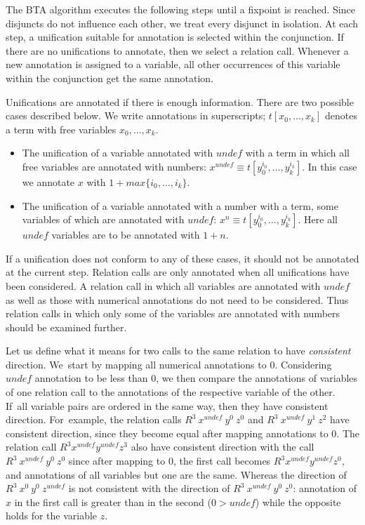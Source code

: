 \documentclass[submission,copyright,creativecommons]{eptcs}
\newcommand\undef{unde\!f}
\begin{document}
The BTA algorithm executes the following steps until a fixpoint is reached.
Since disjuncts do not influence each other, we treat every disjunct in isolation.
At each step, a unification suitable for annotation is selected within the conjunction.
If there are no unifications to annotate, then we select a relation call.
Whenever a new annotation is assigned to a variable, all other occurrences of this variable within the conjunction get the same annotation.

Unifications are annotated if there is enough information.
There are two possible cases described below.
We write annotations in superscripts; $t[x_0, \dots, x_k]$ denotes a term with free variables $x_0, \dots, x_k$.
\begin{itemize}
  \item The unification of a variable annotated with $\undef{}$ with a term in which all free variables are annotated with numbers: $x^{\undef{}} \equiv t[y_0^{i_0},\dots, y_k^{i_k}]$. In this case we annotate $x$ with $1+max\{i_0,\dots,i_k\}$.
  \item The unification of a variable annotated with a number with a term, some variables of which are annotated with $\undef{}$: $x^{n} \equiv t[y_0^{i_0},\dots, y_k^{i_k}]$. Here all $\undef{}$ variables are to be annotated with $1+n$.
\end{itemize}

If a unification does not conform to any of these cases, it should not be annotated at the current step.
Relation calls are only annotated when all unifications have been considered.
A relation call in which all variables are annotated with $\undef{}$ as well as those with numerical annotations do not need to be considered.
Thus relation calls in which only some of the variables are annotated with numbers should be examined further.

Let us define what it means for two calls to the same relation to have  \emph{consistent} direction.
We~start by mapping all numerical annotations to $0$.
Considering $\undef{}$ annotation to be less than $0$, we then compare the annotations of variables of one relation call to the annotations of the respective variable of the other.
If~all variable pairs are ordered in the same way, then they have consistent direction.
For~example, the relation calls $R^3 \ x^{\undef{}} \ y^{0} \ z^{0}$ and $R^3 \ x^{\undef{}} \ y^{1} \ z^{2}$ have consistent direction, since they become equal after mapping annotations to $0$.
The relation call $R^3 x^{\undef{}} y^{\undef{}} z^{3}$ also have consistent direction with the call $R^3 \ x^{\undef{}} \ y^{0} \ z^{0}$ since after mapping to $0$, the first call becomes $R^3 x^{\undef{}} y^{\undef{}} z^{0}$, and annotations of all variables but one are the same.
Whereas the direction of $R^3 \ x^{0} \ y^{0} \ z^{\undef{}}$ is not consistent with the direction of $R^3 \ x^{\undef{}} \ y^{0} \ z^{0}$: annotation of $x$ in the first call is greater than in the second ($0 > \undef{}$) while the opposite holds for the variable $z$.
\end{document}
